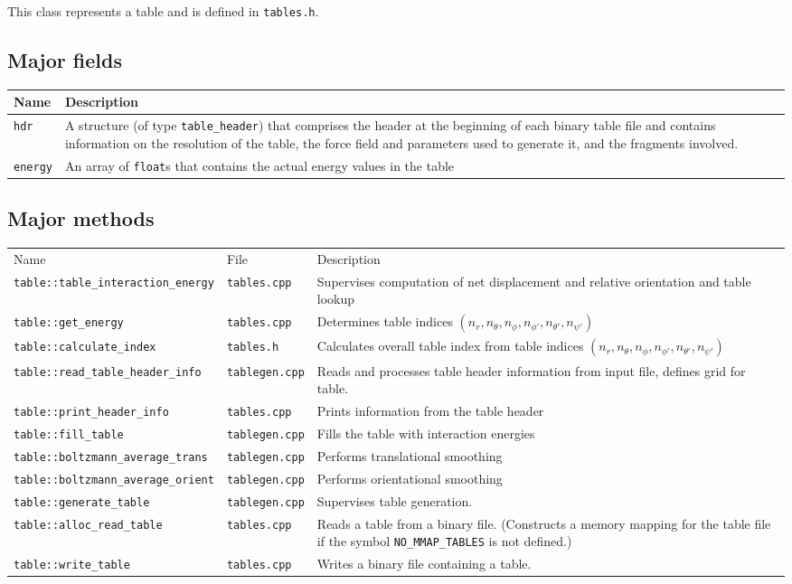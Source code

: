 \documentclass{article}      %
\begin{document}
This class represents a table and is defined in \verb+tables.h+.
\subsection{Major fields}

\begin{tabular}{|p{5cm}|p{11cm}|}
\hline
Name &  Description \\
\hline
\verb+hdr+ & A structure (of type \verb+table_header+) that comprises the header at the beginning of each binary table file and contains information on the resolution of the table, the force field and parameters used to generate it, and the fragments involved. \\
\hline
\verb+energy+ & An array of \verb+float+s that contains the actual energy values in the table  \\
\hline
\end{tabular}

\subsection{Major methods}
\begin{tabular}{|p{7cm}|p{3cm}|p{6cm}|}
\hline
Name & File & Description \\
\verb+table::table_interaction_energy+ & \verb+tables.cpp+ &Supervises computation of net displacement and relative orientation and table lookup \\
\hline
\verb+table::get_energy+ & \verb+tables.cpp+ & Determines table indices $(n_r, n_\theta, n_\phi, n_{\phi'}, n_{\theta'}, n_{\psi'})$ \\
\hline
\verb+table::calculate_index+ & \verb+tables.h+ & Calculates overall table index from table indices $(n_r, n_\theta, n_\phi, n_{\phi'}, n_{\theta'}, n_{\psi'})$ \\
\hline
\verb+table::read_table_header_info+& \verb+tablegen.cpp+ & Reads and processes table header information from input file, defines grid for table. \\
\hline
\verb+table::print_header_info+ & \verb+tables.cpp+ & Prints information from the table header \\
\hline
\verb+table::fill_table+ & \verb+tablegen.cpp+ & Fills the table with interaction energies \\
\hline
\verb+table::boltzmann_average_trans+ & \verb+tablegen.cpp+ & Performs translational smoothing \\
\hline
\verb+table::boltzmann_average_orient+ & \verb+tablegen.cpp+ & Performs orientational smoothing \\
\hline
\verb+table::generate_table+ & \verb+tablegen.cpp+ & Supervises table generation. \\
\hline
\verb+table::alloc_read_table+ & \verb+tables.cpp+ & Reads a table from a binary file.  (Constructs a memory mapping for the table file if the symbol \verb+NO_MMAP_TABLES+ is not defined.) \\
\hline
\verb+table::write_table+ & \verb+tables.cpp+ & Writes a binary file containing a table. \\
\hline
\end{tabular}
\end{document}
